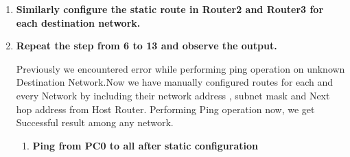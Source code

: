 \documentclass[a4paper,11pt]{article}
\begin{document}
\begin{enumerate}
    \item\textbf{ Similarly configure the static route in Router2 and Router3 for each destination network.
          }


    \item\textbf{ Repeat the step from 6 to 13 and observe the output.
          }

          Previously we encountered error while  performing ping operation on unknown Destination Network.Now we have manually configured routes for each and every Network by including their  network address , subnet mask and Next hop address from Host Router. Performing Ping operation now, we get Successful result among any network.

          \begin{enumerate}
              \item \textbf{Ping from PC0 to all after static configuration}



\end{enumerate}
\end{enumerate}
\end{document}
